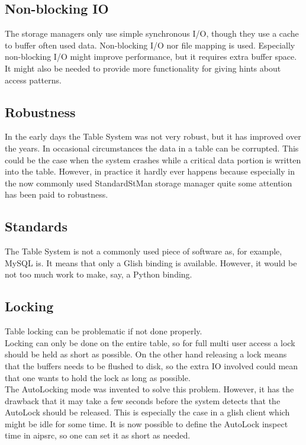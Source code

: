 \subsection{Non-blocking IO}
The storage managers only use simple synchronous I/O, though they use a
cache to buffer often used data.
Non-blocking I/O nor file mapping is used. Especially non-blocking I/O
might improve performance, but it requires extra buffer space.
It might also be needed to provide more functionality for giving hints
about access patterns.

\subsection{Robustness}
In the early days the Table System was not very robust, but it has
improved over the years.
In occasional circumstances the data in a table can be corrupted.
This could be the case when the system crashes while a critical data
portion is written into the table. However, in practice it
hardly ever happens because especially in the now commonly used
StandardStMan storage manager quite some attention has been paid to
robustness.

\subsection{Standards}
The Table System is not a commonly used piece of software as, for
example, MySQL is. It means that only a Glish binding is available.
However, it would be not too much work to make, say, a Python binding.

\subsection{Locking}
Table locking can be problematic if not done properly.
\\Locking can only be done on the entire table, so for full multi user
access a lock should be held as short as possible. On the other hand
releasing a lock means that the buffers needs to be flushed to disk,
so the extra IO involved could mean that one wants to hold the lock
as long as possible.
\\The AutoLocking mode was invented to solve this problem. However,
it has the drawback that it may take a few seconds before the system
detects that the AutoLock should be released. This is especially the
case in a glish client which might be idle for some time. It is now
possible to define the AutoLock inspect time in aipsrc, so one can set
it as short as needed.

